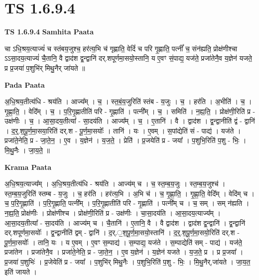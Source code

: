 \documentclass[17pt]{extarticle}
\begin{document}
\section{ TS 1.6.9.4 }

\textbf{TS 1.6.9.4 } \newline
\textbf{Samhita Paata} \newline

चा ऽधि॒श्रय॒त्याज्यं॑ च स्तंबय॒जुश्च॒ हर॑त्य॒भि च॑ गृह्णाति॒ वेदिं॑ च परि गृ॒ह्णाति॒ पत्नीं᳚ च॒ संन॑ह्यति॒ प्रोक्ष॑णीश्चा ऽऽसा॒दय॒त्याज्यं॑ चै॒तानि॒ वै द्वाद॑श द्व॒न्द्वानि॑ दर्.शपूर्णमा॒सयो॒स्तानि॒ य ए॒वꣳ सं॒पाद्य॒ यज॑ते॒ प्रजा॑तेनै॒व य॒ज्ञेन॑ यजते॒ प्र प्र॒जया॑ प॒शुभि॑र् मिथु॒नैर् जा॑यते ॥ \newline

\textbf{Pada Paata} \newline

अ॒धि॒श्रय॒तीत्य॑धि - श्रय॑ति । आज्य᳚म् । च॒ । स्त॒बं॒य॒जुरिति॑ स्तंब - य॒जुः । च॒ । हर॑ति । अ॒भीति॑ । च॒ । गृ॒ह्णा॒ति॒ । वेदि᳚म् । च॒ । प॒रि॒गृ॒ह्णातीति॑ परि - गृ॒ह्णाति॑ । पत्नी᳚म् । च॒ । समिति॑ । न॒ह्य॒ति॒ । प्रोक्ष॑णी॒रिति॑ प्र - उक्ष॑णीः । च॒ । आ॒सा॒दय॒तीत्या᳚ - सा॒दय॑ति । आज्य᳚म् । च॒ । ए॒तानि॑ । वै । द्वाद॑श । द्व॒न्द्वानीति॑ द्वं - द्वानि॑ । द॒र्॒.श॒पू॒र्ण॒मा॒सया॒रिति॑ दर्.श - पू॒र्ण॒मा॒सयोः᳚ । तानि॑ । यः । ए॒वम् । स॒पांद्येति॑ सं - पाद्य॑ । यज॑ते । प्रजा॑ते॒नेति॒ प्र - जा॒ते॒न॒ । ए॒व । य॒ज्ञेन॑ । य॒ज॒ते॒ । प्रेति॑ । प्र॒जयेति॑ प्र - जया᳚ । प॒शुभि॒रिति॑ प॒शु - भिः॒ । मि॒थु॒नैः । जा॒य॒ते॒ ॥  \newline


\textbf{Krama Paata} \newline

अ॒धि॒श्रय॒त्याज्य᳚म् । अ॒धि॒श्रय॒तीत्य॑धि - श्रय॑ति । आज्य॑म् च । च॒ स्त॒म्ब॒य॒जुः । स्त॒म्ब॒य॒जुश्च॑ । स्त॒म्ब॒य॒जुरिति॑ स्तम्ब - य॒जुः । च॒ हर॑ति । हर॑त्य॒भि । अ॒भि च॑ । च॒ गृ॒ह्णा॒ति॒ । गृ॒ह्णा॒ति॒ वेदि᳚म् । वेदि॑म् च । च॒ प॒रि॒गृ॒ह्णाति॑ । प॒रि॒गृ॒ह्णाति॒ पत्नी᳚म् । प॒रि॒गृ॒ह्णातीति॑ परि - गृ॒ह्णाति॑ । पत्नी᳚म् च । च॒ सम् । सम् न॑ह्यति । न॒ह्य॒ति॒ प्रोक्ष॑णीः । प्रोक्ष॑णीश्च । प्रोक्ष॑णी॒रिति॑ प्र - उक्ष॑णीः । चा॒सा॒दय॑ति । आ॒सा॒दय॒त्याज्य᳚म् । आ॒सा॒दय॒तीत्या᳚ - सा॒दय॑ति । आज्य॑म् च । चै॒तानि॑ । ए॒तानि॒ वै । वै द्वाद॑श । द्वाद॑श द्व॒न्द्वानि॑ । द्व॒न्द्वानि॑ दर्.शपूर्णमा॒सयोः᳚ । द्व॒न्द्वानीति॑ द्वम् - द्वानि॑ । द॒र्.॒श॒पू॒र्ण॒मा॒सयो॒स्तानि॑ । द॒र्॒.श॒पू॒र्ण॒मा॒सयो॒रिति॑ दर्.श - पू॒र्ण॒मा॒सयोः᳚ । तानि॒ यः । य ए॒वम् । ए॒वꣳ स॒म्पाद्य॑ । स॒म्पाद्य॒ यज॑ते । स॒म्पाद्येति॑ सम् - पाद्य॑ । यज॑ते॒ प्रजा॑तेन । प्रजा॑तेनै॒व । प्रजा॑ते॒नेति॒ प्र - जा॒ते॒न॒ । ए॒व य॒ज्ञेन॑ । य॒ज्ञेन॑ यजते । य॒ज॒ते॒ प्र । प्र प्र॒जया᳚ । प्र॒जया॑ प॒शुभिः॑ । प्र॒जेयेति॑ प्र - जया᳚ । प॒शुभि॑र् मिथु॒नैः । प॒शुभि॒रिति॑ प॒शु - भिः॒ । मि॒थु॒नैर्,जा॑यते । जा॒य॒त॒ इति॑ जायते । \newline
\end{document}
